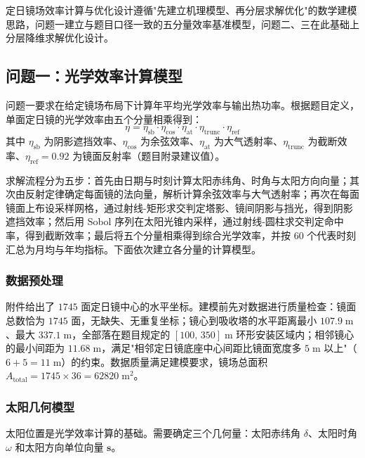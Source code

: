 \documentclass[12pt,a4paper,fontset=fandol]{ctexart}
\begin{document}
定日镜场效率计算与优化设计遵循"先建立机理模型、再分层求解优化"的数学建模思路\cite{1}，问题一建立与题目口径一致的五分量效率基准模型，问题二、三在此基础上分层降维求解优化设计。

\subsection{问题一：光学效率计算模型}

问题一要求在给定镜场布局下计算年平均光学效率与输出热功率。根据题目定义，单面定日镜的光学效率由五个分量相乘得到：
\begin{equation}
    \eta = \eta_{\mathrm{sb}} \cdot \eta_{\mathrm{cos}} \cdot \eta_{\mathrm{at}} \cdot \eta_{\mathrm{trunc}} \cdot \eta_{\mathrm{ref}}
    \label{eq:eta_total}
\end{equation}
其中 $\eta_{\mathrm{sb}}$ 为阴影遮挡效率、$\eta_{\mathrm{cos}}$ 为余弦效率、$\eta_{\mathrm{at}}$ 为大气透射率、$\eta_{\mathrm{trunc}}$ 为截断效率、$\eta_{\mathrm{ref}} = 0.92$ 为镜面反射率（题目附录建议值）。

求解流程分为五步：首先由日期与时刻计算太阳赤纬角、时角与太阳方向向量；其次由反射定律确定每面镜的法向量，解析计算余弦效率与大气透射率；再次在每面镜面上布设采样网格，通过射线-矩形求交判定塔影、镜间阴影与挡光，得到阴影遮挡效率；然后用 Sobol 序列在太阳光锥内采样，通过射线-圆柱求交判定命中率，得到截断效率；最后将五个分量相乘得到综合光学效率，并按 $60$ 个代表时刻汇总为月均与年均指标。下面依次建立各分量的计算模型。

\subsubsection{数据预处理}

附件给出了 $1745$ 面定日镜中心的水平坐标。建模前先对数据进行质量检查：镜面总数恰为 $1745$ 面，无缺失、无重复坐标；镜心到吸收塔的水平距离最小 $107.9\;\mathrm{m}$、最大 $337.1\;\mathrm{m}$，全部落在题目规定的 $[100,\,350]\;\mathrm{m}$ 环形安装区域内；相邻镜心的最小间距为 $11.68\;\mathrm{m}$，满足"相邻定日镜底座中心间距比镜面宽度多 $5\;\mathrm{m}$ 以上"（$6+5=11\;\mathrm{m}$）的约束。数据质量满足建模要求，镜场总面积 $A_{\mathrm{total}} = 1745 \times 36 = 62820\;\mathrm{m}^{2}$。

\subsubsection{太阳几何模型}

太阳位置是光学效率计算的基础\cite{5}。需要确定三个几何量：太阳赤纬角 $\delta$、太阳时角 $\omega$ 和太阳方向单位向量 $\mathbf{s}$。
\end{document}
